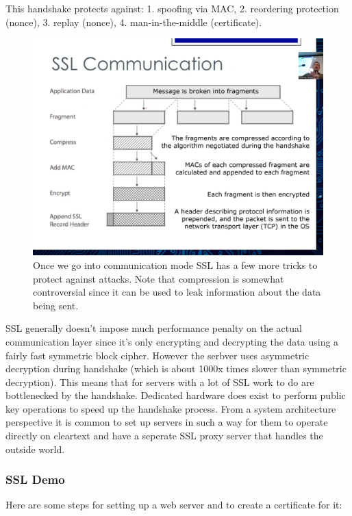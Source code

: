 \documentclass[../notes.tex]{subfiles}
\begin{document}
This handshake protects against: 1. spoofing via MAC, 2. reordering protection (nonce), 3. replay (nonce), 4. man-in-the-middle (certificate).


\begin{figure}[H]
    \centering
    \includegraphics[width=0.8\linewidth]{img/image_2023-03-12-19-42-16.png}
    \caption{Once we go into communication mode SSL has a few more tricks to protect against attacks. Note that compression is somewhat controversial since it can be used to leak information about the data being sent.}
\end{figure}

SSL generally doesn't impose much performance penalty on the actual communication layer since it's only encrypting and decrypting the data using a fairly fast symmetric block cipher. 
However the serbver uses asymmetric decryption during handshake (which is about 1000x times slower than symmetric decryption). This means that for servers with a lot of SSL work to do are bottlenecked by the handshake.
Dedicated hardware does exist to perform public key operations to speed up the handshake process.
From a system architecture perspective it is common to set up servers in such a way for them to operate directly on cleartext and have a seperate SSL proxy server that handles the outside world.


\subsubsection{SSL Demo}





Here are some steps for setting up a web server and to create a certificate for it:
\end{document}
